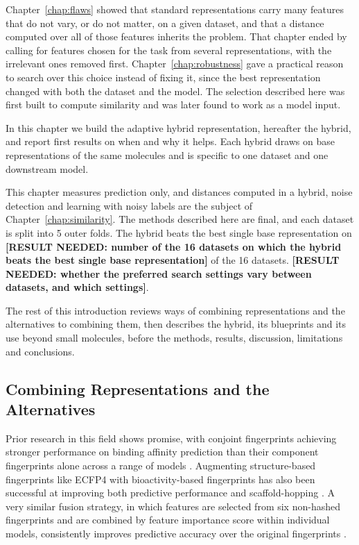 Chapter~\ref{chap:flaws} showed that standard representations carry many features that do not vary, or do not matter, on a given dataset, and that a distance computed over all of those features inherits the problem. That chapter ended by calling for features chosen for the task from several representations, with the irrelevant ones removed first. Chapter~\ref{chap:robustness} gave a practical reason to search over this choice instead of fixing it, since the best representation changed with both the dataset and the model. The selection described here was first built to compute similarity and was later found to work as a model input.

In this chapter we build the adaptive hybrid representation, hereafter the hybrid, and report first results on when and why it helps. Each hybrid draws on base representations of the same molecules and is specific to one dataset and one downstream model.

This chapter measures prediction only, and distances computed in a hybrid, noise detection and learning with noisy labels are the subject of Chapter~\ref{chap:similarity}. The methods described here are final, and each dataset is split into 5 outer folds. The hybrid beats the best single base representation on \textbf{[RESULT NEEDED: number of the 16 datasets on which the hybrid beats the best single base representation]} of the 16 datasets. \textbf{[RESULT NEEDED: whether the preferred search settings vary between datasets, and which settings]}.

The rest of this introduction reviews ways of combining representations and the alternatives to combining them, then describes the hybrid, its blueprints and its use beyond small molecules, before the methods, results, discussion, limitations and conclusions.


\subsection{Combining Representations and the Alternatives}

Prior research in this field shows promise, with conjoint fingerprints achieving stronger performance on binding affinity prediction than their component fingerprints alone across a range of models \citep{Xie2020}. Augmenting structure-based fingerprints like ECFP4 with bioactivity-based fingerprints has also been successful at improving both predictive performance and scaffold-hopping \citep{Laufktter2019}. A very similar fusion strategy, in which features are selected from six non-hashed fingerprints and are combined by feature importance score within individual models, consistently improves predictive accuracy over the original fingerprints \citep{Turkina2025}. 

